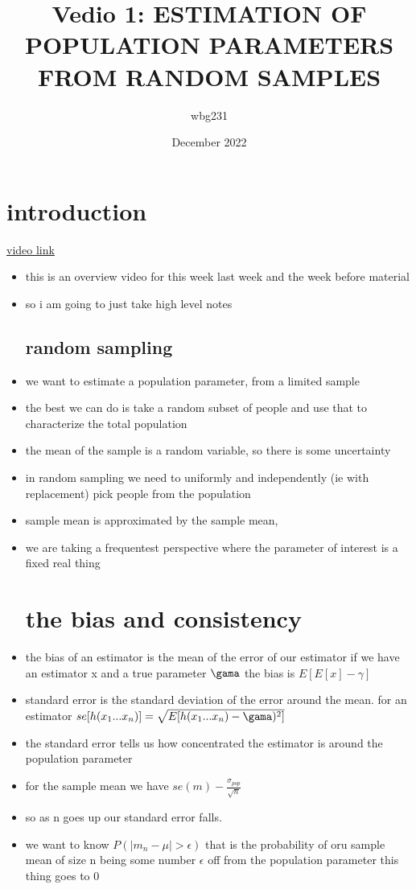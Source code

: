 \documentclass{article}
\title{Vedio 1: ESTIMATION OF POPULATION PARAMETERS FROM RANDOM SAMPLES}
\author{wbg231 }
\date{December 2022}
\begin{document}
\maketitle

\section{introduction}
\href{https://www.youtube.com/watch?v=XtiH5kytdnw&list=PLBEf5mJtE6KuZ5NBQMuWIMsiOOrV9ibzm&index=77}{video link}
\begin{itemize}
\item this is an overview video for this week last week and the week before material 
\item so i am going to just take high level notes
\subsection{random sampling}
\item we want to estimate a population parameter, from a limited sample 
\item the best we can do is take a random subset of people and use that to characterize the total population
\item the mean of the sample is a random variable, so there is some uncertainty
\item in random sampling we need to uniformly and independently (ie with replacement) pick people from the population
\item sample mean is approximated by the sample mean, 
\item we are taking a frequentest perspective where the parameter of interest is a fixed real thing 
\section{the bias and consistency}
\item the bias of an estimator is the mean of the error of our estimator if we have an estimator x and a true parameter $\gama$ the bias is $E[E[x]-\gamma]$
\item standard error is the standard deviation of the error around the mean. for an estimator $se[h(x_1...x_n)]=\sqrt{E[h(x_1...x_n)-\gama)^2]}$
\item the standard error tells us how concentrated the estimator is around the population parameter 
\item for the sample mean we have $se(m)-\frac{\sigma_{pop}}{\sqrt{n}}$
\item so as n goes up our standard error falls. 
\item we want to know $P(|m_n-\mu|>\epsilon)$ that is the probability of oru sample mean of size n being some number $\epsilon$ off from the population parameter this thing goes to 0

\end{itemize}
\end{document}

